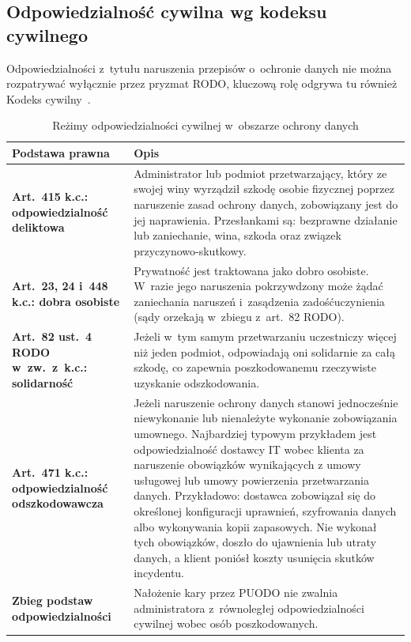 \subsection{Odpowiedzialność cywilna wg kodeksu cywilnego}

Odpowiedzialności z~tytułu naruszenia przepisów o~ochronie danych nie można rozpatrywać wyłącznie przez pryzmat RODO, kluczową rolę odgrywa tu również
Kodeks cywilny~\autocite{kc1964}.

\begin{table}[H]
\centering
\caption{Reżimy odpowiedzialności cywilnej w~obszarze ochrony danych}
\label{tab:odpowiedzialnosc_cywilna}
\begin{tabular}{>{\bfseries}p{5cm} p{8.5cm}}
\hline
Podstawa prawna & Opis \\
\hline
Art.~415 k.c.: odpowiedzialność deliktowa
  & Administrator lub podmiot przetwarzający, który ze swojej winy wyrządził
    szkodę osobie fizycznej poprzez naruszenie zasad ochrony danych,
    zobowiązany jest do jej naprawienia. Przesłankami są: bezprawne działanie
    lub zaniechanie, wina, szkoda oraz związek przyczynowo-skutkowy. \\[4pt]
Art.~23, 24 i~448 k.c.: dobra osobiste
  & Prywatność jest traktowana jako dobro osobiste. W~razie jego naruszenia
    pokrzywdzony może żądać zaniechania naruszeń i~zasądzenia
    zadośćuczynienia (sądy orzekają w~zbiegu z~art.~82 RODO). \\[4pt]
Art.~82 ust.~4 RODO w~zw.\ z~k.c.: solidarność
  & Jeżeli w~tym samym przetwarzaniu uczestniczy więcej niż jeden podmiot,
    odpowiadają oni solidarnie za całą szkodę, co zapewnia poszkodowanemu
    rzeczywiste uzyskanie odszkodowania. \\[4pt]
Art.~471 k.c.: odpowiedzialność odszkodowawcza
  & Jeżeli naruszenie ochrony danych stanowi jednocześnie niewykonanie 
  lub nienależyte wykonanie zobowiązania umownego. 
  Najbardziej typowym przykładem jest odpowiedzialność dostawcy IT wobec 
  klienta za naruszenie obowiązków wynikających z umowy usługowej lub umowy powierzenia przetwarzania danych.
Przykładowo: dostawca zobowiązał się do określonej konfiguracji uprawnień, szyfrowania danych albo wykonywania kopii zapasowych. Nie wykonał tych obowiązków, doszło do ujawnienia lub utraty danych, a klient poniósł koszty usunięcia skutków incydentu. \\[4pt]    
Zbieg podstaw odpowiedzialności
  & Nałożenie kary przez PUODO nie zwalnia administratora z~równoległej
    odpowiedzialności cywilnej wobec osób poszkodowanych. \\
\hline
\end{tabular}
\end{table}

